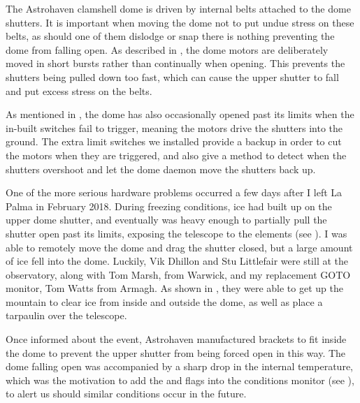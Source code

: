 \begin{colsection}
The Astrohaven clamshell dome is driven by internal belts attached to the dome shutters. It is important when moving the dome not to put undue stress on these belts, as should one of them dislodge or snap there is nothing preventing the dome from falling open. As described in , the dome motors are deliberately moved in short bursts rather than continually when opening. This prevents the shutters being pulled down too fast, which can cause the upper shutter to fall and put excess stress on the belts.

As mentioned in , the dome has also occasionally opened past its limits when the in-built switches fail to trigger, meaning the motors drive the shutters into the ground. The extra limit switches we installed provide a backup in order to cut the motors when they are triggered, and also give a method to detect when the shutters overshoot and let the dome daemon move the shutters back up.

One of the more serious hardware problems occurred a few days after I left La Palma in February 2018. During freezing conditions, ice had built up on the upper dome shutter, and eventually was heavy enough to partially pull the shutter open past its limits, exposing the telescope to the elements (see ). I was able to remotely move the dome and drag the shutter closed, but a large amount of ice fell into the dome. Luckily, Vik Dhillon and Stu Littlefair were still at the observatory, along with Tom Marsh, from Warwick, and my replacement GOTO monitor, Tom Watts from Armagh. As shown in , they were able to get up the mountain to clear ice from inside and outside the dome, as well as place a tarpaulin over the telescope.

Once informed about the event, Astrohaven manufactured brackets to fit inside the dome to prevent the upper shutter from being forced open in this way. The dome falling open was accompanied by a sharp drop in the internal temperature, which was the motivation to add the  and  flags into the conditions monitor (see ), to alert us should similar conditions occur in the future.


\end{colsection}
